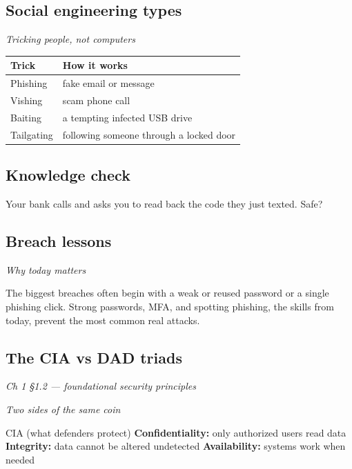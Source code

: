 \documentclass[12pt,openany]{book}
\begin{document}
\medskip

\subsection*{Social engineering types}
{\small\itshape\color{gray}Tricking people, not computers}


\begin{center}\small\begin{tabular}{p{6.5cm}p{6.5cm}}\toprule
\textbf{Trick} & \textbf{How it works} \\ \midrule
Phishing & fake email or message \\
Vishing & scam phone call \\
Baiting & a tempting infected USB drive \\
Tailgating & following someone through a locked door \\
\bottomrule\end{tabular}\end{center}

\medskip

\subsection*{Knowledge check}

Your bank calls and asks you to read back the code they just texted. Safe?

\medskip

\subsection*{Breach lessons}
{\small\itshape\color{gray}Why today matters}


The biggest breaches often begin with a weak or reused password or a single phishing click. Strong passwords, MFA, and spotting phishing, the skills from today, prevent the most common real attacks.

\medskip

\subsection*{The CIA vs DAD triads}
{\small\itshape\color{gray}Ch 1 §1.2 --- foundational security principles}

{\small\itshape\color{gray}Two sides of the same coin}

CIA (what defenders protect)
\textbf{Confidentiality:} only authorized users read data
\textbf{Integrity:} data cannot be altered undetected
\textbf{Availability:} systems work when needed
\end{document}

